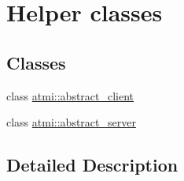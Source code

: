 \hypertarget{group__helpers}{}\section{Helper classes}
\label{group__helpers}
\subsection*{Classes}
\begin{DoxyCompactItemize}
\item 
class \hyperlink{classatmi_1_1abstract__client}{atmi\+::abstract\+\_\+client}
\item 
class \hyperlink{classatmi_1_1abstract__server}{atmi\+::abstract\+\_\+server}
\end{DoxyCompactItemize}


\subsection{Detailed Description}

